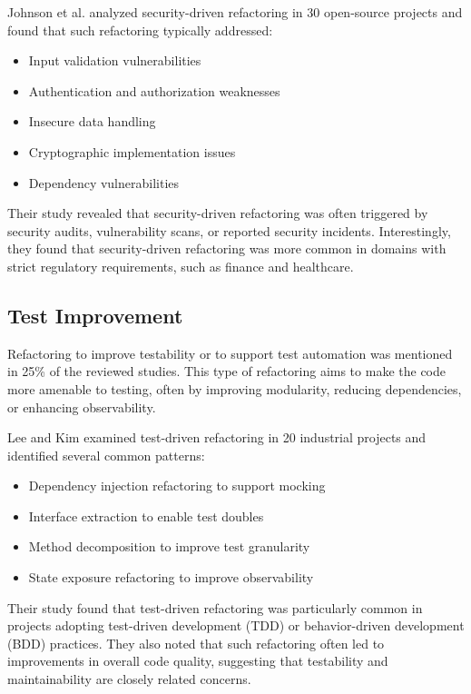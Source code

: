 \documentclass[journal,onecolumn]{IEEEtran}
\begin{document}
Johnson et al. \cite{johnson2023} analyzed security-driven refactoring in 30 open-source projects and found that such refactoring typically addressed:
\begin{itemize}
    \item Input validation vulnerabilities
    \item Authentication and authorization weaknesses
    \item Insecure data handling
    \item Cryptographic implementation issues
    \item Dependency vulnerabilities
\end{itemize}

Their study revealed that security-driven refactoring was often triggered by security audits, vulnerability scans, or reported security incidents. Interestingly, they found that security-driven refactoring was more common in domains with strict regulatory requirements, such as finance and healthcare.

\subsection{Test Improvement}
Refactoring to improve testability or to support test automation was mentioned in 25\% of the reviewed studies. This type of refactoring aims to make the code more amenable to testing, often by improving modularity, reducing dependencies, or enhancing observability.

Lee and Kim \cite{lee2023} examined test-driven refactoring in 20 industrial projects and identified several common patterns:
\begin{itemize}
    \item Dependency injection refactoring to support mocking
    \item Interface extraction to enable test doubles
    \item Method decomposition to improve test granularity
    \item State exposure refactoring to improve observability
\end{itemize}

Their study found that test-driven refactoring was particularly common in projects adopting test-driven development (TDD) or behavior-driven development (BDD) practices. They also noted that such refactoring often led to improvements in overall code quality, suggesting that testability and maintainability are closely related concerns.
\end{document}
